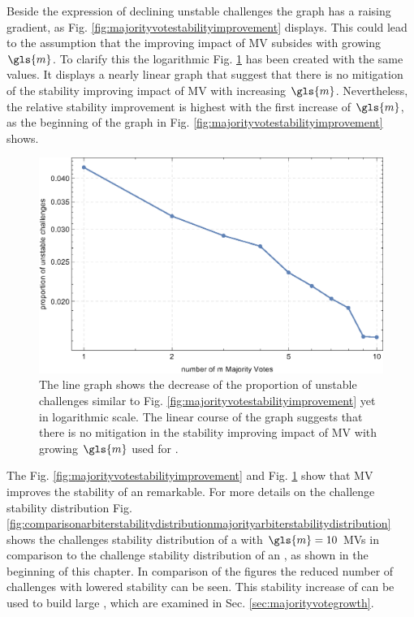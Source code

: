 Beside the expression of declining unstable challenges the graph has a raising gradient, as Fig. \ref{fig:majorityvotestabilityimprovement} displays.
This could lead to the assumption that the improving impact of \ac{MV} subsides with growing $\gls{m}$.
To clarify this the logarithmic Fig. \ref{fig:majorityvotestabilityimprovementloglog} has been created with the same values.
It displays a nearly linear graph that suggest that there is no mitigation of the stability improving impact of \ac{MV} with increasing $\gls{m}$.
Nevertheless, the relative stability improvement is highest with the first increase of $\gls{m}$, as the beginning of the graph in Fig.  \ref{fig:majorityvotestabilityimprovement} shows.

\begin{figure}[htp]
\includegraphics[width=1.00\textwidth]{images/single-votes-stab-simulation_loglog.eps}
\caption[Decrease of unstable challenges of a \mpuf logarithmic]{The line graph shows the decrease of the proportion of unstable challenges similar to Fig. \ref{fig:majorityvotestabilityimprovement} yet in logarithmic scale. The  linear course of the graph suggests that there is no mitigation in the stability improving impact of \ac{MV} with growing $\gls{m}$ used for \mpufs.} 
\label{fig:majorityvotestabilityimprovementloglog}
\end{figure}

The Fig. \ref{fig:majorityvotestabilityimprovement} and Fig. \ref{fig:majorityvotestabilityimprovementloglog} show that \ac{MV} improves the stability of an \apuf remarkable. 
For more details on the challenge stability distribution Fig. \ref{fig:comparisonarbiterstabilitydistributionmajorityarbiterstabilitydistribution} shows the challenges stability distribution of a \mpuf with $\gls{m} = 10$ \acp{MV} in comparison to the challenge stability distribution of an \apuf, as shown in the beginning of this chapter.
In comparison of the figures the reduced number of challenges with lowered stability can be seen.
This stability increase of \mpufs can be used to build large \mxpufs, which are examined in Sec. \ref{sec:majorityvotegrowth}.

